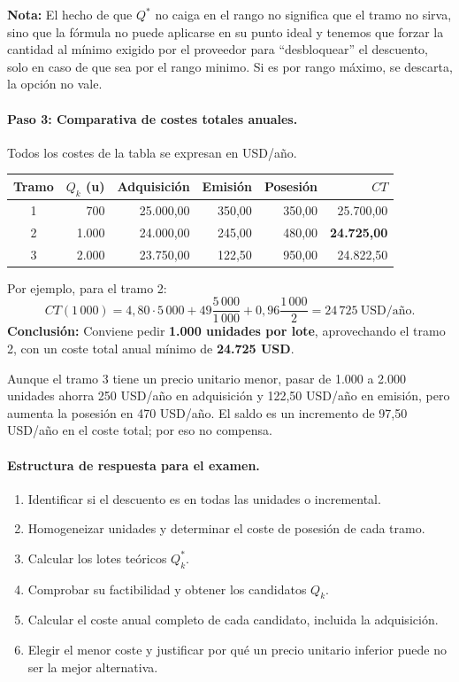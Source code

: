 \documentclass[11pt,a4paper]{article}
\begin{document}
\textbf{Nota:} El hecho de que $Q^*$ no caiga en el rango no significa que el tramo no sirva, sino que la fórmula no puede aplicarse en su punto ideal y tenemos que forzar la cantidad al mínimo exigido por el proveedor para ``desbloquear'' el descuento, solo en caso de que sea por el rango minimo. Si es por rango máximo, se descarta, la opción no vale.

\paragraph{Paso 3: Comparativa de costes totales anuales.}
Todos los costes de la tabla se expresan en USD/año.
\begin{center}
    \small
    \renewcommand{\arraystretch}{1.2}
    \begin{tabular}{@{}crrrrr@{}}
        \toprule
        Tramo & $Q_k$ (u) & Adquisición & Emisión & Posesión & $CT$               \\
        \midrule
        1     & 700       & 25.000,00   & 350,00  & 350,00   & 25.700,00          \\
        2     & 1.000     & 24.000,00   & 245,00  & 480,00   & \textbf{24.725,00} \\
        3     & 2.000     & 23.750,00   & 122,50  & 950,00   & 24.822,50          \\
        \bottomrule
    \end{tabular}
\end{center}

Por ejemplo, para el tramo 2:
\[
    CT(1\,000)=4{,}80\cdot5\,000
    +49\frac{5\,000}{1\,000}
    +0{,}96\frac{1\,000}{2}
    =24\,725\ \text{USD/año}.
\]
\textbf{Conclusión:} Conviene pedir \textbf{1.000 unidades por lote}, aprovechando el tramo 2, con un coste total anual mínimo de \textbf{24.725 USD}.

Aunque el tramo 3 tiene un precio unitario menor, pasar de 1.000 a 2.000 unidades ahorra 250 USD/año en adquisición y 122,50 USD/año en emisión, pero aumenta la posesión en 470 USD/año. El saldo es un incremento de 97,50 USD/año en el coste total; por eso no compensa.

\paragraph{Estructura de respuesta para el examen.}
\begin{enumerate}
    \item Identificar si el descuento es en todas las unidades o incremental.
    \item Homogeneizar unidades y determinar el coste de posesión de cada tramo.
    \item Calcular los lotes teóricos $Q_k^{*}$.
    \item Comprobar su factibilidad y obtener los candidatos $Q_k$.
    \item Calcular el coste anual completo de cada candidato, incluida la adquisición.
    \item Elegir el menor coste y justificar por qué un precio unitario inferior puede no ser la mejor alternativa.
\end{enumerate}
\end{document}
